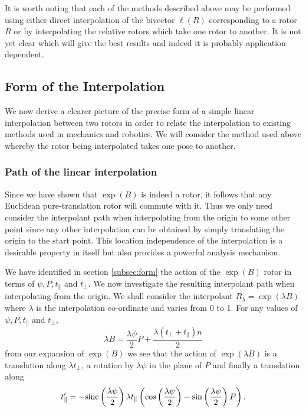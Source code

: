 It is worth noting that each of the methods described above may be performed
using either direct interpolation of the bivector $\ell(R)$ corresponding
to a rotor $R$ or by interpolating the relative rotors which take one rotor
to another. It is not yet clear which will give the best results and indeed
it is probably application dependent.


\subsection{Form of the Interpolation}

We now derive a clearer picture of the precise form of
a simple linear interpolation between two rotors in order to relate the 
interpolation to existing methods used in mechanics and robotics. We will consider
the method used above whereby the rotor being interpolated takes one pose to another.

\subsubsection{Path of the linear interpolation}

Since we have shown that $\exp(B)$ is indeed a rotor, it follows that any
Euclidean pure-translation rotor will commute with it. Thus we only need consider the
interpolant path when interpolating from the origin to some other point since
any other interpolation can be obtained by simply translating the origin to
the start point. This location independence of the interpolation is a 
desirable property in itself but also provides a powerful analysis mechanism.


We have identified in section \ref{subsec:form} the action of the $\exp(B)$
rotor in terms of $\psi, P, t_\parallel$ and $t_\perp$. We now investigate the resulting interpolant
path when interpolating from the origin. We shall consider the interpolant
$R_\lambda = \exp(\lambda B)$ where $\lambda$ is the interpolation co-ordinate and
varies from 0 to 1. For any values of $\psi, P, t_\parallel$ and $t_\perp$,
\[
\lambda B = \frac{\lambda \psi}{2} P + \frac{\lambda (t_\perp + t_\parallel) n}{2}
\]
from our expansion of $\exp(B)$ we see that the action of $\exp(\lambda B)$ is a translation along $\lambda t_\perp$, a rotation by
$\lambda \psi$ in the plane of $P$ and finally a translation along
\[
t'_\parallel =- \mathrm{sinc}\left(\frac{\lambda\psi}{2}\right)
\lambda t_\parallel
\left(
\cos\left(\frac{\lambda \psi}{2}\right) -
\sin\left(\frac{\lambda \psi}{2}\right) P 
\right).
\]

